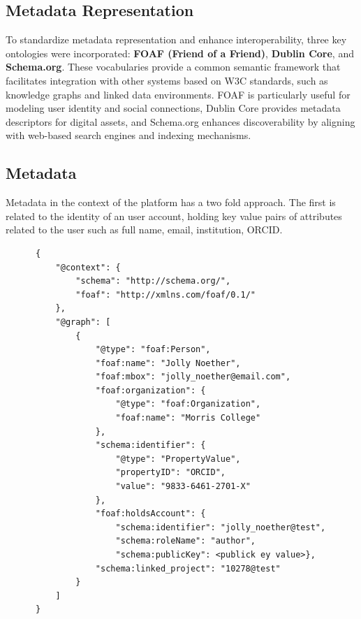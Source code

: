 \documentclass{article}
\begin{document}
\subsection{Metadata Representation}


To standardize metadata representation and enhance interoperability, three key ontologies were incorporated: \textbf{FOAF (Friend of a Friend)}, \textbf{Dublin Core}, and \textbf{Schema.org}. These vocabularies provide a common semantic framework that facilitates integration with other systems based on W3C standards, such as knowledge graphs and linked data environments. FOAF is particularly useful for modeling user identity and social connections, Dublin Core provides metadata descriptors for digital assets, and Schema.org enhances discoverability by aligning with web-based search engines and indexing mechanisms.



\subsection{Metadata}

Metadata in the context of the platform has a two fold approach. The first is related to the identity of an user account, holding key value pairs of attributes related to the user such as full name, email, institution, ORCID.


\begin{verbatim}
      {
          "@context": {
              "schema": "http://schema.org/",
              "foaf": "http://xmlns.com/foaf/0.1/"
          },
          "@graph": [
              {
                  "@type": "foaf:Person",
                  "foaf:name": "Jolly Noether",
                  "foaf:mbox": "jolly_noether@email.com",
                  "foaf:organization": {
                      "@type": "foaf:Organization",
                      "foaf:name": "Morris College"
                  },
                  "schema:identifier": {
                      "@type": "PropertyValue",
                      "propertyID": "ORCID",
                      "value": "9833-6461-2701-X"
                  },
                  "foaf:holdsAccount": {
                      "schema:identifier": "jolly_noether@test",
                      "schema:roleName": "author",
                      "schema:publicKey": <publick ey value>},
                  "schema:linked_project": "10278@test"
              }
          ]
      }
      \end{verbatim}
\end{document}
